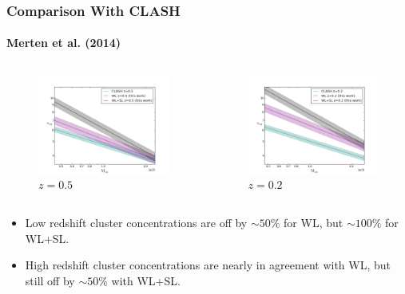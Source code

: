 \documentclass[hyperref={pdfpagelabels=false}]{beamer}
\begin{document}
\begin{frame}
\frametitle{Comparison With CLASH}
\framesubtitle{Merten et al. (2014)}
  \begin{columns}
    \centering
    \begin{column}{0.5\textwidth}
      \begin{figure}
        \includegraphics[width=\textwidth]{Clash_Comparison_05.png}
        \caption{$z=0.5$}
      \end{figure}
    \end{column}
    \begin{column}{0.5\textwidth}
      \begin{figure}
        \includegraphics[width=\textwidth]{Clash_Comparison_02.png}
        \caption{$z=0.2$}
      \end{figure}
    \end{column}
  \end{columns}
    \begin{itemize}
    \item Low redshift cluster concentrations are off by $\mathrm{\sim 50\%}$
      for WL, but $\mathrm{\sim 100\%}$ for WL+SL.
    \item High redshift cluster concentrations are nearly in agreement with WL,
      but still off by $\mathrm{\sim 50\%}$ with WL+SL.
    \end{itemize}
\end{frame}
\end{document}
